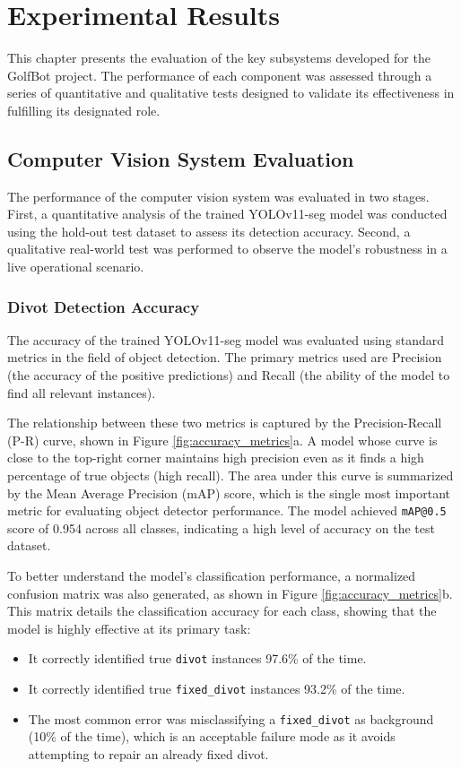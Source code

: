 
\chapter{Experimental Results}
\label{chap:validation}
This chapter presents the evaluation of the key subsystems developed for the GolfBot project. The performance of each component was assessed through a series of quantitative and qualitative tests designed to validate its effectiveness in fulfilling its designated role.

\section{Computer Vision System Evaluation}
\label{sec:cv_evaluation}
The performance of the computer vision system was evaluated in two stages. First, a quantitative analysis of the trained YOLOv11-seg model was conducted using the hold-out test dataset to assess its detection accuracy. Second, a qualitative real-world test was performed to observe the model's robustness in a live operational scenario.

\subsection{Divot Detection Accuracy}
\label{ssec:cv_accuracy}

The accuracy of the trained YOLOv11-seg model was evaluated using standard metrics in the field of object detection. The primary metrics used are Precision (the accuracy of the positive predictions) and Recall (the ability of the model to find all relevant instances).

The relationship between these two metrics is captured by the Precision-Recall (P-R) curve, shown in Figure \ref{fig:accuracy_metrics}a. A model whose curve is close to the top-right corner maintains high precision even as it finds a high percentage of true objects (high recall). The area under this curve is summarized by the Mean Average Precision (mAP) score, which is the single most important metric for evaluating object detector performance. The model achieved \texttt{mAP@0.5} score of 0.954 across all classes, indicating a high level of accuracy on the test dataset.

To better understand the model's classification performance, a normalized confusion matrix was also generated, as shown in Figure \ref{fig:accuracy_metrics}b. This matrix details the classification accuracy for each class, showing that the model is highly effective at its primary task:
\begin{itemize}
    \item It correctly identified true \texttt{divot} instances 97.6\% of the time.
    \item It correctly identified true \texttt{fixed\_divot} instances 93.2\% of the time.
    \item The most common error was misclassifying a \texttt{fixed\_divot} as background (10\% of the time), which is an acceptable failure mode as it avoids attempting to repair an already fixed divot.
\end{itemize}

